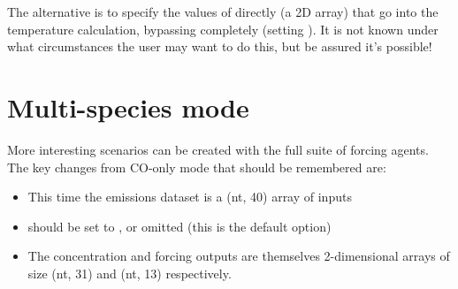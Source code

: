 \documentclass[letterpaper,10pt,english]{sphinxmanual}
\begin{document}
\begin{sphinxVerbatim}[commandchars=\\\{\}]
 
\end{sphinxVerbatim}

\noindent{}

The alternative is to specify the values of  directly (a 2D array)
that go into the temperature calculation, bypassing 
completely (setting ). It is not known under what
circumstances the user may want to do this, but be assured it's
possible!

\begin{sphinxVerbatim}[commandchars=\\\{\}]
    
\PYG{p}{[}\PYG{p}{]}  

  
\PYG{p}{[}\PYG{p}{]}  
\PYG{p}{[}\PYG{p}{]}  
  
 \PYG{p}{[}\PYG{p}{]} \PYG{p}{[}\PYG{p}{]} \PYG{p}{[}\PYG{p}{]}
\end{sphinxVerbatim}


\section{Multi-species mode}
\label{\detokenize{examples:multi-species-mode}}
More interesting scenarios can be created with the full suite of forcing
agents. The key changes from CO-only mode that should be
remembered are:
\begin{itemize}
\item {} 
This time the emissions dataset is a (nt, 40) array of inputs

\item {} 
 should be set to , or omitted (this is the
default option)

\item {} 
The concentration and forcing outputs are themselves 2-dimensional
arrays of size (nt, 31) and (nt, 13) respectively.

\end{itemize}
\end{document}

